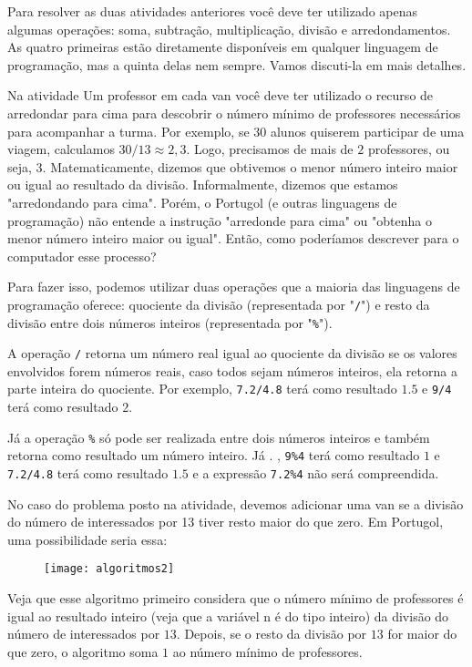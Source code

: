 \label{comp-arr3}

Para resolver as duas atividades anteriores você deve ter utilizado apenas algumas operações: soma, subtração, multiplicação, divisão e arredondamentos. As quatro primeiras estão diretamente disponíveis em qualquer linguagem de programação, mas a quinta delas nem sempre. Vamos discuti-la em mais detalhes.

Na atividade Um professor em cada van você deve ter utilizado o recurso de arredondar para cima para descobrir o número mínimo de professores necessários para acompanhar a turma. Por exemplo, se $30$ alunos quiserem participar de uma viagem, calculamos $30/13 \approx 2,3 $. Logo, precisamos de mais de $2$ professores, ou seja, $3$. Matematicamente, dizemos que obtivemos o menor número inteiro maior ou igual ao resultado da divisão. Informalmente, dizemos que estamos "arredondando para cima". Porém, o Portugol (e outras linguagens de programação) não entende a instrução "arredonde para cima"{} ou "obtenha o menor número inteiro maior ou igual". Então, como poderíamos descrever para o computador esse processo?

Para fazer isso, podemos utilizar duas operações que a maioria das linguagens de programação oferece: quociente da divisão (representada por "\verb|/|") e resto da divisão entre dois números inteiros (representada por "\verb|%|").

A operação \verb|/| retorna um número real igual ao quociente da divisão se os valores envolvidos forem números reais, caso todos sejam números inteiros, ela retorna a parte inteira do quociente. Por exemplo, \verb|7.2/4.8| terá como resultado $1.5$ e \verb|9/4| terá como resultado $2$.

Já a operação \verb|%| só pode ser realizada entre dois números inteiros e também retorna como resultado um número inteiro. Já . , \verb|9%4| terá como resultado $1$ e \verb|7.2/4.8| terá como resultado $1.5$ e a expressão \verb|7.2%4| não será compreendida.

No caso do problema posto na atividade, devemos adicionar uma van se a divisão do número de interessados por 13 tiver resto maior do que zero. Em Portugol, uma possibilidade seria essa:

\begin{figure}[H]
\centering

\texttt{[image: algoritmos2]}
\end{figure}

Veja que esse algoritmo primeiro considera que o número mínimo de professores é igual ao resultado inteiro (veja que a variável n é do tipo inteiro) da divisão do número de interessados por $13$. Depois, se o resto da divisão por $13$ for maior do que zero, o algoritmo soma $1$ ao número mínimo de professores.

